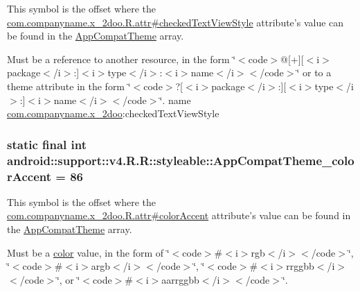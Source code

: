 This symbol is the offset where the \hyperlink{classcom_1_1companyname_1_1x__2doo_1_1_r_1_1attr_b28d2f6fb5e0102cab1f1b4f30877075}{com.companyname.x\_\-2doo.R.attr\#checkedTextViewStyle} attribute's value can be found in the \hyperlink{classandroid_1_1support_1_1v4_1_1_r_1_1styleable_0873e92ba21076bb5a4aeadeb7f5779f}{AppCompatTheme} array.

Must be a reference to another resource, in the form \char`\"{}$<$code$>$@\mbox{[}+\mbox{]}\mbox{[}$<$i$>$package$<$/i$>$:\mbox{]}$<$i$>$type$<$/i$>$:$<$i$>$name$<$/i$>$$<$/code$>$\char`\"{} or to a theme attribute in the form \char`\"{}$<$code$>$?\mbox{[}$<$i$>$package$<$/i$>$:\mbox{]}\mbox{[}$<$i$>$type$<$/i$>$:\mbox{]}$<$i$>$name$<$/i$>$$<$/code$>$\char`\"{}.  name \hyperlink{namespacecom_1_1companyname_1_1x__2doo}{com.companyname.x\_\-2doo}:checkedTextViewStyle \hypertarget{classandroid_1_1support_1_1v4_1_1_r_1_1styleable_3b87ab5d2175f20e4b41056387826bdc}{
\subsubsection[{AppCompatTheme\_\-colorAccent}]{\setlength{\rightskip}{0pt plus 5cm}static final int android::support::v4.R.R::styleable::AppCompatTheme\_\-colorAccent = 86}}
\label{classandroid_1_1support_1_1v4_1_1_r_1_1styleable_3b87ab5d2175f20e4b41056387826bdc}


This symbol is the offset where the \hyperlink{classcom_1_1companyname_1_1x__2doo_1_1_r_1_1attr_f2c20ce739e0c854987875661d3ff895}{com.companyname.x\_\-2doo.R.attr\#colorAccent} attribute's value can be found in the \hyperlink{classandroid_1_1support_1_1v4_1_1_r_1_1styleable_0873e92ba21076bb5a4aeadeb7f5779f}{AppCompatTheme} array.

Must be a \hyperlink{classandroid_1_1support_1_1v4_1_1_r_1_1color}{color} value, in the form of \char`\"{}$<$code$>$\#$<$i$>$rgb$<$/i$>$$<$/code$>$\char`\"{}, \char`\"{}$<$code$>$\#$<$i$>$argb$<$/i$>$$<$/code$>$\char`\"{}, \char`\"{}$<$code$>$\#$<$i$>$rrggbb$<$/i$>$$<$/code$>$\char`\"{}, or \char`\"{}$<$code$>$\#$<$i$>$aarrggbb$<$/i$>$$<$/code$>$\char`\"{}. 

